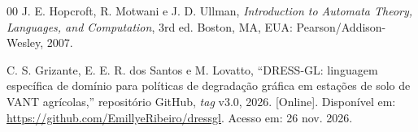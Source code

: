 \documentclass[conference]{IEEEtran}
\begin{document}
\begin{thebibliography}{00}
 J. E. Hopcroft, R. Motwani e J. D. Ullman,
\textit{Introduction to Automata Theory, Languages, and Computation}, 3rd ed.
Boston, MA, EUA: Pearson/Addison-Wesley, 2007.

 C. S. Grizante, E. E. R. dos Santos e M. Lovatto,
``DRESS-GL: linguagem específica de domínio para políticas de degradação
gráfica em estações de solo de VANT agrícolas,'' repositório GitHub,
\textit{tag} v3.0, 2026. [Online]. Disponível em:
\url{https://github.com/EmillyeRibeiro/dressgl}. Acesso em: 26 nov. 2026.

\end{thebibliography}
\end{document}
